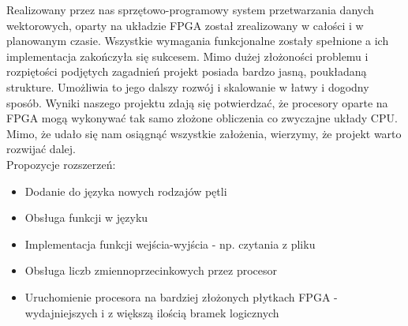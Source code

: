 Realizowany przez nas sprzętowo-programowy system przetwarzania danych wektorowych, oparty na układzie FPGA został zrealizowany w całości i w planowanym czasie. Wszystkie wymagania funkcjonalne zostały spełnione a ich implementacja zakończyła się sukcesem. Mimo dużej złożoności problemu i rozpiętości podjętych zagadnień projekt posiada bardzo jasną, poukładaną strukture. Umożliwia to jego dalszy rozwój i skalowanie w łatwy i dogodny sposób. Wyniki naszego projektu zdają się potwierdzać, że procesory oparte na FPGA mogą wykonywać tak samo złożone obliczenia co zwyczajne układy CPU. Mimo, że udało się nam osiągnąć wszystkie założenia, wierzymy, że projekt warto rozwijać dalej.\\Propozycje rozszerzeń:
\begin{itemize}
  \item Dodanie do języka nowych rodzajów pętli
  \item Obsługa funkcji w języku
  \item Implementacja funkcji wejścia-wyjścia - np. czytania z pliku
  \item Obsługa liczb zmiennoprzecinkowych przez procesor
  \item Uruchomienie procesora na bardziej złożonych płytkach FPGA - wydajniejszych i z większą ilością bramek logicznych
\end{itemize}
